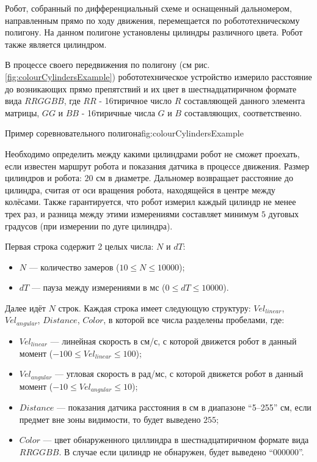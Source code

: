 

Робот, собранный по дифференциальный схеме и оснащенный дальномером, направленным прямо по ходу движения,
перемещается по робототехническому полигону.
На данном полигоне установлены цилиндры различного цвета. Робот также является цилиндром.

В процессе своего передвижения по полигону (см рис. \ref{fig:colourCylindersExample})
робототехническое устройство измерило расстояние до возникающих прямо препятствий
и их цвет в шестнадцатиричном формате вида $RRGGBB$, где $RR$ - 16тиричное число $R$ составляющей данного элемента
матрицы, $GG$ и $BB$ - 16тиричные числа $G$ и $B$ составляющих, соответственно.

{Пример соревновательного полигона}{fig:colourCylindersExample}

Необходимо определить между какими цилиндрами робот не сможет проехать, если известен маршрут робота и показания
датчика в процессе движения.
Размер цилиндров и робота: $20$ см в диаметре.
Дальномер возвращает расстояние до цилиндра, считая от оси вращения робота,
находящейся в центре между колёсами.
Также гарантируется, что робот измерил каждый цилиндр не менее трех раз, и разница между этими измерениями составляет
минимум $5$ дуговых градусов (при измерении по дуге цилиндра).


Первая строка содержит 2 целых числа: $N$ и $dT$:
\begin{itemize}
    \item $N$ --- количество замеров ($10 \leq N \leq 10000$);
    \item $dT$ --- пауза между измерениями в мс ($0 \leq dT \leq 10000$).
\end{itemize}

Далее идёт $N$ строк. Каждая строка имеет следующую структуру:
$Vel_{linear}$, \linebreak $Vel_{angular}$, $Distance$, $Color$, в которой все числа разделены пробелами, где:
\begin{itemize}
    \item $Vel_{linear}$ --- линейная скорость в см/с, с которой движется робот в данный момент ($-100 \leq Vel_{linear} \leq 100$);
    \item $Vel_{angular}$ --- угловая скорость в рад/мс, с которой движется робот в данный момент ($-10 \leq Vel_{angular} \leq 10$);
    \item $Distance$ --- показания датчика расстояния в см в диапазоне ``5--255'' см, если предмет вне зоны видимости, то
    будет выведено $255$;
    \item $Color$ --- цвет обнаруженного циллиндра в шестнадцатиричном формате вида $RRGGBB$.
    В случае если цилиндр не обнаружен, будет выведено ``000000''.
\end{itemize}

